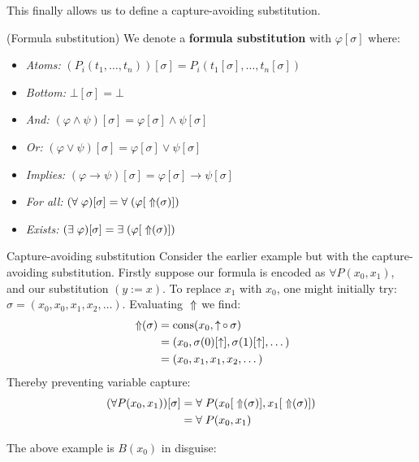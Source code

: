 This finally allows us to define a capture-avoiding substitution.

\begin{cthdefinition}{(Formula substitution)}
We denote a \textbf{formula substitution} with \(\varphi [ \sigma ]\) where:
\begin{itemize}[noitemsep,topsep=0pt]
\item \emph{Atoms:} \((P_i(t_1, \dots, t_n))[ \sigma ] = P_i(t_1[ \sigma ], \dots, t_n[ \sigma ])\)
\item \emph{Bottom:} \(\bot [ \sigma ] = \bot\)
\item \emph{And:} \((\varphi \land \psi)[ \sigma ] = \varphi[\sigma] \land \psi[\sigma]\)
\item \emph{Or:} \((\varphi \lor \psi)[ \sigma ] = \varphi[\sigma] \lor \psi[\sigma]\)
\item \emph{Implies:} \((\varphi \to \psi)[ \sigma ] = \varphi[\sigma] \to \psi[\sigma]\)
\item \emph{For all:} \((\forall\;\varphi)[ \sigma ] = \forall\;(\varphi[\operatorname{\;\Uparrow}(\sigma)])\)
\item \emph{Exists:} \((\exists\;\varphi)[ \sigma ] = \exists\;(\varphi[\operatorname{\;\Uparrow}(\sigma)])\)
\end{itemize}
\end{cthdefinition}

\begin{cthexample}{Capture-avoiding substitution}
  Consider the earlier example but with the capture-avoiding substitution. Firstly suppose our formula is encoded as \(\forall P(x_0, x_1)\), and our substitution \((y := x)\). To replace $x_1$ with $x_0$, one might initially try: \(\sigma = (x_0, x_0, x_1, x_2, \dots)\). Evaluating $\operatorname{\;\Uparrow}$ we find:
  {\small\begin{align*}
    \operatorname{\;\Uparrow}(\sigma) &= \operatorname{cons}(x_0,\operatorname{\uparrow} \operatorname{\circ} \sigma) \\
                &= (x_0, \sigma(0)[\operatorname{\uparrow}], \sigma(1)[\operatorname{\uparrow}], \dots) \\
                &= (x_0, x_1, x_1, x_2, \dots)
  \end{align*}}
  Thereby preventing variable capture:
  {\small\begin{align*}
    (\forall P(x_0, x_1)) [\sigma] &= \forall\; P(x_0[\operatorname{\;\Uparrow}(\sigma)], x_1[\operatorname{\;\Uparrow}(\sigma)]) \\
                                  &= \forall\; P(x_0, x_1)
  \end{align*}}
\end{cthexample}

The above example is $B(x_0)$ in disguise:

